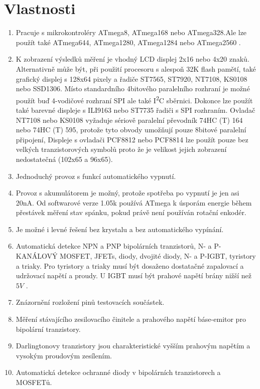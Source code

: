 \chapter{Vlastnosti}
\label{sec:features}
\begin{enumerate} \setlength{\itemsep}{0pt}
\item Pracuje s mikrokontroléry ATmega8, ATmega168 nebo ATmega328.Ale lze použít také ATmega644, ATmega1280,
ATmega1284 nebo ATmega2560 .
\item K zobrazení výsledků měření je vhodný LCD displej 2x16 nebo 4x20 znaků.
 Alternativně může být, při použití procesoru s alespoň 32K flash pamětí, také grafický displej
 s 128x64 pixely a řadiče ST7565, ST7920, NT7108, KS0108 nebo SSD1306.
 Místo standardního 4bitového paralelního rozhraní je možné použít buď 4-vodičové rozhraní SPI ale také I\textsuperscript{2}C sběrnici.
 Dokonce lze použít také barevné displeje s ILI9163 nebo ST7735 řadiči s SPI rozhraním.
 Ovladač NT7108 nebo KS0108 vyžaduje sériově paralelní převodník 74HC (T) 164 nebo 74HC (T) 595,
 protože tyto obvody umožňují pouze 8bitové paralelní připojení,
 Displeje s ovladači PCF8812 nebo PCF8814 lze použít pouze bez velkých tranzistorových symbolů
 proto že je velikost jejich zobrazení nedostatečná (102x65 a 96x65).
\item Jednoduchý provoz s funkcí automatického vypnutí.
\item Provoz s akumulátorem je možný, protože spotřeba po vypnutí je jen asi 20nA.
Od softwarové verze 1.05k používá ATmega k úsporám energie během přestávek měření stav spánku, pokud právě není používán rotační enkodér.
\item Je možné i levné řešení bez krystalu a bez automatického vypínání.
\item Automatická detekce NPN a PNP bipolárních tranzistorů, N- a P-KANÁLOVÝ MOSFET, JFETs, diody, dvojité diody, N- a P-IGBT, tyristory a triaky.
Pro tyristory a triaky musí být dosaženo dostatačné zapalovací a udržovací napětí a proudy.
U IGBT musí být prahové napětí brány nižší než  \(5V\) .
\item Znázornění rozložení pinů testovacích součástek.
\item Měření stávajícího zesilovacího činitele a prahového napětí báse-emitor pro bipolární tranzistory.
\item Darlingtonovy tranzistory jsou charakteristické vyšším prahovým napětím a vysokým proudovým zesílením.
\item Automatická detekce ochranné diody v bipolárních tranzistorech a MOSFETů.

\end{enumerate}
